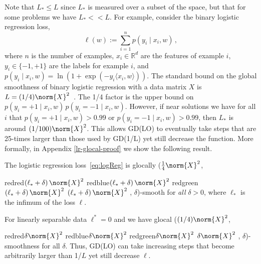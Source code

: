 \documentclass[10pt]{article} %
\newif\ifshowcolours
\def\red{red}
\def\blue{blue}
\def\green{green}
\renewcommand{\textcolor}[2]{%
  \ifshowcolours
    {\color{#1}#2}%
  \else
    \def\temp{#1}%
    \ifx\temp\red     #2\else
    \ifx\temp\blue    #2\else
    \ifx\temp\green   #2\else
        {\color{#1}#2}%
    \fi\fi\fi
  \fi
}
\begin{document}
Note that $L_* \leq L$ since $L_*$ is measured over a subset of the space, but that for some problems we have $L_* << L$. For example, consider the binary logistic regression loss,
\begin{equation}
    \ell(w) := \sum_{i = 1}^{n} p(y_i \; | \; x_i, w) \,,
    \label{eq:logReg}
\end{equation}
where $n$ is the number of examples,  $x_i \in \mathbb{R}^{d}$ are the features of example $i$, $y_i \in \{-1, +1\}$ are the labels for example $i$, and $p(y_i \; | \; x_i, w) = \ln(1 + \exp(-y_i \langle x_i, w \rangle))$. The standard bound on the global smoothness of binary logistic regression with a data matrix $X$ is $L = (1/4)\norm{X}^2$~\cite{bohning1992multinomial}. The 1/4 factor is the upper bound on $p(y_i = +1 \; | \; x_i, w) \, p(y_i = -1 \; | \; x_i, w)$. However, if near solutions we have for all $i$ that $p(y_i=+1 \; | \; x_i, w) > 0.99$ or $p(y_i = -1\; | \; x_i, w) > 0.99$, then $L_*$ is around $(1/100)\norm{X}^2$. This allows GD(LO) to eventually take steps that are 25-times larger than those used by GD(1/L) yet still decrease the function. More formally, in Appendix \ref{lr-glocal-proof} we show the following result.
\begin{lemma}
\label{lem:logReg}
The logistic regression loss~\eqref{eq:logReg} is glocally ($\frac 1 4\norm{X}^2$, \textcolor{red}{$(\ell_{*} + \delta)\, \norm{X}^2$}, $\delta$)-smooth for \textit{all} $\delta > 0$, where $\ell_{*}$ is the infimum of the loss $\ell$.
    \label{lem:logistic-glocal}
\end{lemma}
For linearly separable data $\ell^*=0$ and we have glocal ($(1/4)\norm{X}^2$, \textcolor{red}{$\delta\norm{X}^2$}, $\delta$)-smoothness for all $\delta$. Thus, GD(LO) can take increasing steps that become arbitrarily larger than 1/$L$ yet still decrease $\ell$. 


\end{document}
